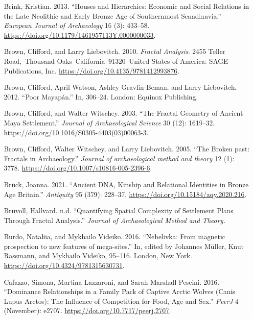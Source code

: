 \documentclass[
  12pt,
  a4paper, twoside]{book}
\newlength{\cslhangindent}
\newlength{\cslentryspacingunit} %
\newenvironment{CSLReferences}[2] %
 {%
  \setlength{\parindent}{0pt}
  \ifodd #1
  \let\oldpar\par
  \def\par{\hangindent=\cslhangindent\oldpar}
  \fi
  \setlength{\parskip}{#2\cslentryspacingunit}
 }%
 {}
\begin{document}
\begin{CSLReferences}{1}{0}
\leavevmode{}%
Brink, Kristian. 2013. {``Houses and Hierarchies: Economic and Social Relations in the Late Neolithic and Early Bronze Age of Southernmost Scandinavia.''} \emph{European Journal of Archaeology} 16 (3): 433--58. \url{https://doi.org/10.1179/1461957113Y.0000000033}.

\leavevmode{}%
Brown, Clifford, and Larry Liebovitch. 2010. \emph{Fractal Analysis}. 2455 Teller Road,~Thousand Oaks~California~91320~United States of America: SAGE Publications, Inc. \url{https://doi.org/10.4135/9781412993876}.

\leavevmode{}%
Brown, Clifford, April Watson, Ashley Gravlin-Beman, and Larry Liebovitch. 2012. {``Poor Mayapán.''} In, 306--24. London: Equinox Publishing.

\leavevmode{}%
Brown, Clifford, and Walter Witschey. 2003. {``The Fractal Geometry of Ancient Maya Settlement.''} \emph{Journal of Archaeological Science} 30 (12): 1619--32. \url{https://doi.org/10.1016/S0305-4403(03)00063-3}.

\leavevmode{}%
Brown, Clifford, Walter Witschey, and Larry Liebovitch. 2005. {``The Broken past: Fractals in Archaeology.''} \emph{Journal of archaeological method and theory} 12 (1): 3778. \url{https://doi.org/10.1007/s10816-005-2396-6}.

\leavevmode{}%
Brück, Joanna. 2021. {``Ancient DNA, Kinship and Relational Identities in Bronze Age Britain.''} \emph{Antiquity} 95 (379): 228--37. \url{https://doi.org/10.15184/aqy.2020.216}.

\leavevmode{}%
Bruvoll, Hallvard. n.d. {``Quantifying Spatial Complexity of Settlement Plans Through Fractal Analysis.''} \emph{Journal of Archaeological Method and Theory}.

\leavevmode{}%
Burdo, Nataliia, and Mykhailo Videiko. 2016. {``Nebelivka: From magnetic prospection to new features of mega-sites.''} In, edited by Johannes Müller, Knut Rassmann, and Mykhailo Videiko, 95--116. London, New York. \url{https://doi.org/10.4324/9781315630731}.

\leavevmode{}%
Cafazzo, Simona, Martina Lazzaroni, and Sarah Marshall-Pescini. 2016. {``Dominance Relationships in a Family Pack of Captive Arctic Wolves (Canis Lupus Arctos): The Influence of Competition for Food, Age and Sex.''} \emph{PeerJ} 4 (November): e2707. \url{https://doi.org/10.7717/peerj.2707}.


\end{CSLReferences}
\end{document}
